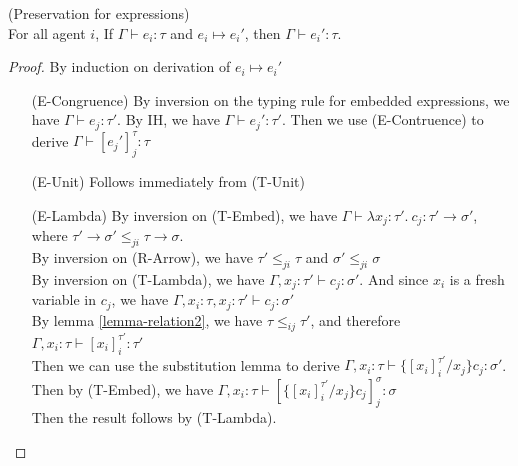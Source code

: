 \begin{lemma} (Preservation for expressions) \\
For all agent $i$, If $\Gamma \vdash e_i : \tau$ and $e_i \mapsto e_i'$, then $\Gamma \vdash e_i' : \tau$.
\begin{proof}
By induction on derivation of $e_i \mapsto e_i'$
\begin{enumerate}[align=left]
\item[(E-Congruence)] By inversion on the typing rule for embedded expressions, we have $\Gamma \vdash e_j : \tau'$. By IH, we have $\Gamma \vdash e_j' : \tau'$. Then we use (E-Contruence) to derive $\Gamma \vdash [e_j']^\tau_j : \tau$

\item[(E-Unit)] Follows immediately from  (T-Unit)
\item[(E-Lambda)] By inversion on (T-Embed), we have $\Gamma \vdash \lambda x_j:\tau'.\ c_j : \tau' \rightarrow \sigma'$, where $\tau' \rightarrow \sigma' \leq_{ji} \tau \rightarrow \sigma$.\\
By inversion on (R-Arrow), we have $\tau' \leq_{ji} \tau$ and $\sigma' \leq_{ji} \sigma$\\
By inversion on (T-Lambda), we have $\Gamma, x_j : \tau' \vdash c_j : \sigma'$. And since $x_i$ is a fresh variable in $c_j$, we have $\Gamma, x_i : \tau, x_j : \tau' \vdash c_j : \sigma'$\\
By lemma \ref{lemma-relation2}, we have $\tau \leq_{ij} \tau'$, and therefore $\Gamma, x_i : \tau \vdash [x_i]^{\tau'}_i : \tau'$\\
Then we can use the substitution lemma to derive $\Gamma, x_i : \tau \vdash \{[x_i]^{\tau'}_i / x_j\}c_j : \sigma'$.\\
Then by (T-Embed), we have $\Gamma, x_i : \tau \vdash [  \{[x_i]^{\tau'}_i / x_j\}c_j ]^\sigma_j : \sigma$\\
Then the result follows by (T-Lambda).

\end{enumerate}
\end{proof}
\end{lemma}

